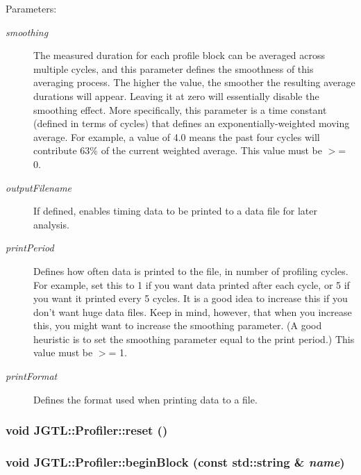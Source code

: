 \begin{Desc}
\item[Parameters:]
\begin{description}
\item[{\em smoothing}]The measured duration for each profile block can be averaged across multiple cycles, and this parameter defines the smoothness of this averaging process. The higher the value, the smoother the resulting average durations will appear. Leaving it at zero will essentially disable the smoothing effect. More specifically, this parameter is a time constant (defined in terms of cycles) that defines an exponentially-weighted moving average. For example, a value of 4.0 means the past four cycles will contribute 63\% of the current weighted average. This value must be $>$= 0. \item[{\em output\-Filename}]If defined, enables timing data to be printed to a data file for later analysis. \item[{\em print\-Period}]Defines how often data is printed to the file, in number of profiling cycles. For example, set this to 1 if you want data printed after each cycle, or 5 if you want it printed every 5 cycles. It is a good idea to increase this if you don't want huge data files. Keep in mind, however, that when you increase this, you might want to increase the smoothing parameter. (A good heuristic is to set the smoothing parameter equal to the print period.) This value must be $>$= 1. \item[{\em print\-Format}]Defines the format used when printing data to a file. \end{description}
\end{Desc}
\hypertarget{class_j_g_t_l_1_1_profiler_452c2c61daaec460f716b014062287d3}{
\subsubsection[reset]{\setlength{\rightskip}{0pt plus 5cm}void JGTL::Profiler::reset ()}}
\label{class_j_g_t_l_1_1_profiler_452c2c61daaec460f716b014062287d3}


\hypertarget{class_j_g_t_l_1_1_profiler_c77059c32d833a4b638468b88c5dc001}{
\subsubsection[beginBlock]{\setlength{\rightskip}{0pt plus 5cm}void JGTL::Profiler::begin\-Block (const std::string \& {\em name})}}
\label{class_j_g_t_l_1_1_profiler_c77059c32d833a4b638468b88c5dc001}


